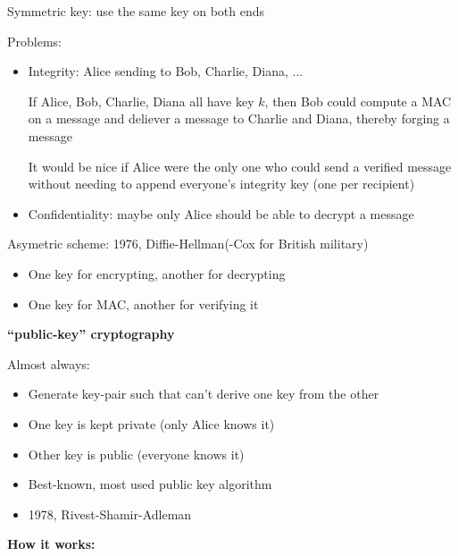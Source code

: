 Symmetric key: use the same key on both ends

Problems:
\begin{itemize}
    \item Integrity: Alice sending to Bob, Charlie, Diana, ...

        If Alice, Bob, Charlie, Diana all have key $k$, then Bob could compute
        a MAC on a message and deliever a message to Charlie and Diana, thereby
        forging a message

        It would be nice if Alice were the only one who could send a verified
        message without needing to append everyone's integrity key (one per
        recipient)
    \item Confidentiality: maybe only Alice should be able to decrypt a message
\end{itemize}

Asymetric scheme: 1976, Diffie-Hellman(-Cox for British military)
\begin{itemize}
\item One key for encrypting, another for decrypting
\item One key for MAC, another for verifying it
\end{itemize}

\begin{definition}
{\bf ``public-key'' cryptography}

    Almost always:
    \begin{itemize}
        \item Generate key-pair such that can't derive one key from the other
        \item One key is kept private (only Alice knows it)
        \item Other key is public (everyone knows it)
    \end{itemize}
\end{definition}

\begin{itemize}
    \item Best-known, most used public key algorithm
    \item 1978, Rivest-Shamir-Adleman
\end{itemize}

{\bf How it works:}

